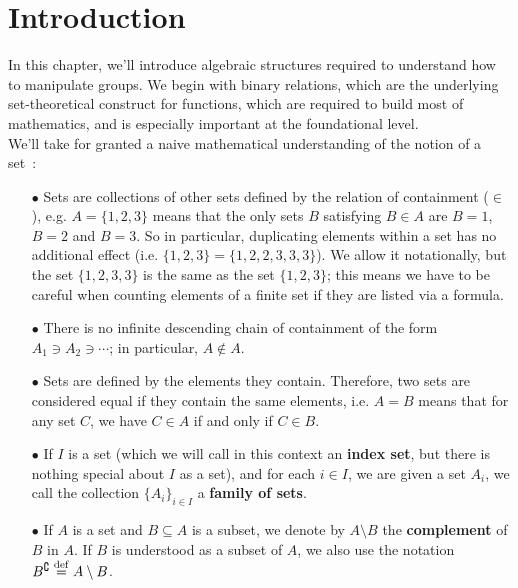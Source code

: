 
\section{Introduction} \label{binary-relations-chapter-intro}

In this chapter, we'll introduce algebraic structures required to understand how to manipulate groups. We begin with binary relations, which are the underlying set-theoretical construct for functions, which are required to build most of mathematics, and is especially important at the foundational level.
\\

We'll take for granted a naive mathematical understanding of the notion of a set~:
\\

\begin{itemize}
	\item[$\bullet$] Sets are collections of other sets defined by the relation of containment ($\in$), e.g. $A = \{1,2,3\}$ means that the only sets $B$ satisfying $B \in A$ are $B=1$, $B=2$ and $B=3$. So in particular, duplicating elements within a set has no additional effect (i.e. $\{1,2,3\} = \{1,2,2,3,3,3\}$). We allow it notationally, but the set $\{1,2,3,3\}$ is the same as the set $\{1,2,3\}$; this means we have to be careful when counting elements of a finite set if they are listed via a formula.
	\\

	\item[$\bullet$] There is no infinite descending chain of containment of the form $A_1 \ni A_2 \ni \cdots$; in particular, $A \notin A$.
	\\

	\item[$\bullet$] Sets are defined by the elements they contain. Therefore, two sets are considered equal if they contain the same elements, i.e. $A=B$ means that for any set $C$, we have $C \in A$ if and only if $C \in B$. 
	\\

	\item[$\bullet$] If $I$ is a set (which we will call in this context an \textbf{index set}, but there is nothing special about $I$ as a set), and for each $i \in I$, we are given a set $A_i$, we call the collection $\{A_i\}_{i \in I}$ a \textbf{family of sets}.
	\\

	\item[$\bullet$] If $A$ is a set and $B \subseteq A$ is a subset, we denote by $A \setminus B$ the \textbf{complement} of $B$ in $A$. If $B$ is understood as a subset of $A$, we also use the notation $B^{\complement} \overset{\mathrm{def}}{=} A \setminus B$. 
	\\
\end{itemize}

